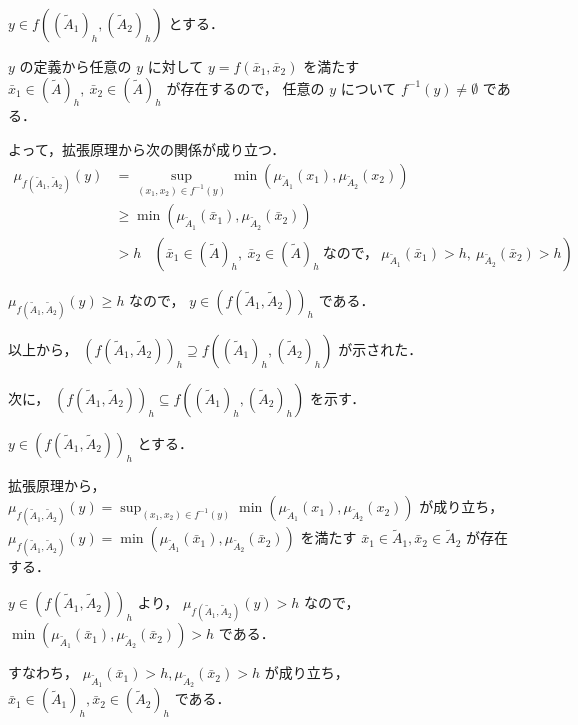 \documentclass[uplatex, a4j, 10pt, fleqn, dvipdfmx]{article}
\begin{document}
\noindent
$y \in f \left( ( \tilde{A}_1 )_h, ( \tilde{A}_2 )_h \right)$ とする．

\noindent
$y$ の定義から任意の $y$ に対して $y = f \left( \bar{x}_1, \bar{x}_2 \right)$ を満たす
$\bar{x}_1 \in ( \tilde{A} )_h, ~ \bar{x}_2 \in ( \tilde{A} )_h$ が存在するので，
任意の $y$ について $f^{-1}(y) \neq \emptyset$ である．

\noindent
よって，拡張原理から次の関係が成り立つ．
\begin{align}
	\mu_{f \left( \tilde{A}_1, \tilde{A}_2 \right)}(y)
	 & = \sup_{\left( x_1, x_2 \right) \in f^{-1}(y)} \min \left( \mu_{\tilde{A}_1}(x_1), \mu_{\tilde{A}_2}(x_2) \right)
	\\
	 & \geq \min \left( \mu_{\tilde{A}_1}(\bar{x}_1), \mu_{\tilde{A}_2}(\bar{x}_2) \right)
	\\
	 & > h ~~~~
	\left( \bar{x}_1 \in ( \tilde{A} )_h, ~ \bar{x}_2 \in ( \tilde{A} )_h ~ \text{なので，} ~ \mu_{\tilde{A}_1}(\bar{x}_1) > h, ~ \mu_{\tilde{A}_2}(\bar{x}_2) > h \right)
\end{align}

\noindent
$\mu_{f \left( \tilde{A}_1, \tilde{A}_2 \right)}(y) \geq h$ なので， $y \in \left( f \left( \tilde{A}_1, \tilde{A}_2 \right) \right)_h$ である．

\noindent
以上から， $\left( f \left( \tilde{A}_1, \tilde{A}_2 \right) \right)_h \supseteq
	f \left( ( \tilde{A}_1 )_h, ( \tilde{A}_2 )_h \right)$ が示された．

\noindent
次に， $\left( f \left( \tilde{A}_1, \tilde{A}_2 \right) \right)_h \subseteq
	f \left( ( \tilde{A}_1 )_h, ( \tilde{A}_2 )_h \right)$ を示す．

\noindent
$y \in \left( f \left( \tilde{A}_1, \tilde{A}_2 \right) \right)_h$ とする．

\noindent
拡張原理から， $\mu_{f\left( \tilde{A}_1, \tilde{A}_2 \right)}(y) = \sup_{\left( x_1, x_2 \right) \in f^{-1}(y)} \min \left( \mu_{\tilde{A}_1}(x_1), \mu_{\tilde{A}_2}(x_2) \right)$
が成り立ち，
$\mu_{f\left( \tilde{A}_1, \tilde{A}_2 \right)}(y) = \min \left( \mu_{\tilde{A}_1}(\bar{x}_1), \mu_{\tilde{A}_2}(\bar{x}_2) \right)$
を満たす $\bar{x}_1 \in \tilde{A}_1, \bar{x}_2 \in \tilde{A}_2$ が存在する．

\noindent
$y \in \left( f \left( \tilde{A}_1, \tilde{A}_2 \right) \right)_h$ より， $\mu_{f\left( \tilde{A}_1, \tilde{A}_2 \right)}(y) > h$ なので，
$\min \left( \mu_{\tilde{A}_1}(\bar{x}_1), \mu_{\tilde{A}_2}(\bar{x}_2) \right) > h$ である．

\noindent
すなわち， $\mu_{\tilde{A}_1}(\bar{x}_1) > h, \mu_{\tilde{A}_2}(\bar{x}_2) > h$ が成り立ち，
$\bar{x}_1 \in ( \tilde{A}_1 )_h, \bar{x}_2 \in ( \tilde{A}_2 )_h$ である．
\end{document}
